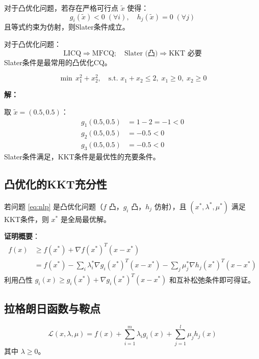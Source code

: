 \begin{definition}[Slater条件]
对于凸优化问题，若存在严格可行点 $\tilde{x}$ 使得：
\[
g_i(\tilde{x}) < 0 \; (\forall i), \quad h_j(\tilde{x}) = 0 \; (\forall j)
\]
且等式约束为仿射，则Slater条件成立。
\end{definition}

\begin{theorem}[CQ的蕴含关系]
对于凸优化问题：
\[
\text{LICQ} \Rightarrow \text{MFCQ}; \quad \text{Slater (凸)} \Rightarrow \text{KKT 必要}
\]
Slater条件是最常用的凸优化CQ。
\end{theorem}

\begin{example}[Slater条件验证]
\[
\min \, x_1^2 + x_2^2, \quad \text{s.t. } x_1 + x_2 \leq 2, \; x_1 \geq 0, \; x_2 \geq 0
\]

\textbf{解：}

取 $\tilde{x} = (0.5, 0.5)$：
\begin{align*}
g_1(0.5, 0.5) &= 1 - 2 = -1 < 0 \\
g_2(0.5, 0.5) &= -0.5 < 0 \\
g_3(0.5, 0.5) &= -0.5 < 0
\end{align*}
Slater条件满足，KKT条件是最优性的充要条件。
\end{example}

\subsection{凸优化的KKT充分性}

\begin{theorem}[KKT充分条件]\label{thm:kkt-sufficient}
若问题 \eqref{eq:nlp} 是凸优化问题（$f$ 凸，$g_i$ 凸，$h_j$ 仿射），且 $(x^*, \lambda^*, \mu^*)$ 满足KKT条件，则 $x^*$ 是全局最优解。
\end{theorem}

\textbf{证明概要}：
\begin{align*}
f(x) &\geq f(x^*) + \nabla f(x^*)^T(x - x^*) \\
&= f(x^*) - \sum_i \lambda_i^* \nabla g_i(x^*)^T(x - x^*) - \sum_j \mu_j^* \nabla h_j(x^*)^T(x - x^*)
\end{align*}
利用凸性 $g_i(x) \geq g_i(x^*) + \nabla g_i(x^*)^T(x-x^*)$ 和互补松弛条件即可得证。

\subsection{拉格朗日函数与鞍点}

\begin{definition}[一般拉格朗日函数]
\[
\mathcal{L}(x, \lambda, \mu) = f(x) + \sum_{i=1}^m \lambda_i g_i(x) + \sum_{j=1}^l \mu_j h_j(x)
\]
其中 $\lambda \geq 0$。
\end{definition}

